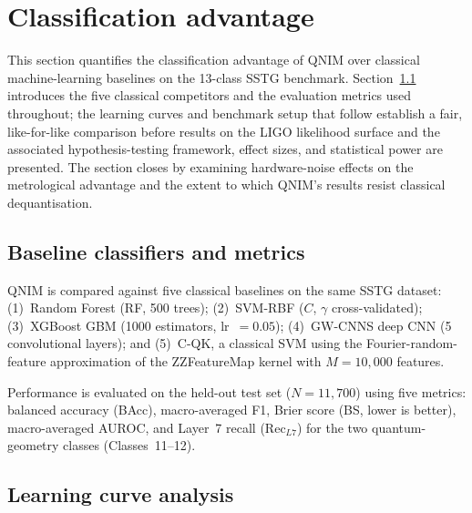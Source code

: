 \documentclass[11pt,a4paper, english]{book}
\theoremstyle{plain}
\theoremstyle{definition}
\numberwithin{equation}{chapter}
\numberwithin{figure}{chapter}
\numberwithin{table}{chapter}
\begin{document}
\section{Classification advantage}
\label{sec:classif-advantage}

This section quantifies the classification advantage of QNIM over
classical machine-learning baselines on the 13-class SSTG benchmark.
Section~\ref{subsec:baselines} introduces the five classical
competitors and the evaluation metrics used throughout; the learning
curves and benchmark setup that follow establish a fair, like-for-like
comparison before results on the LIGO likelihood surface and the
associated hypothesis-testing framework, effect sizes, and statistical
power are presented. The section closes by examining hardware-noise
effects on the metrological advantage and the extent to which QNIM's
results resist classical dequantisation.
\subsection{Baseline classifiers and metrics}
\label{subsec:baselines}

QNIM is compared against five classical baselines on the same SSTG dataset:
(1)~Random Forest (RF, 500 trees); (2)~SVM-RBF ($C$, $\gamma$ cross-validated);
(3)~XGBoost GBM (1000 estimators, lr~$=0.05$); (4)~GW-CNNS deep CNN
\cite{George_2018} (5 convolutional layers); and (5)~C-QK, a classical SVM
using the Fourier-random-feature approximation of the ZZFeatureMap kernel
\cite{Rahimi_2007} with $M=10{,}000$ features.

Performance is evaluated on the held-out test set ($N=11{,}700$) using five
metrics: balanced accuracy (BAcc), macro-averaged F1, Brier score (BS, lower
is better), macro-averaged AUROC, and Layer~7 recall ($\mathrm{Rec}_{L7}$)
for the two quantum-geometry classes (Classes~11--12).

\subsection{Learning curve analysis}
\label{subsec:learning-curves}
\end{document}
